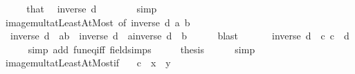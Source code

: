 \begin{isabellebody}
%
\isadelimproof
%
\endisadelimproof
%
\isatagproof
{}\isamarkupfalse%
\ {\isacharminus}{\kern0pt}\isanewline
\ \ \isamarkupfalse%
\ that\ \isamarkupfalse%
\ {\isachardoublequoteopen}inverse\ d\ {\isachargreater}{\kern0pt}\ {}{\isachardoublequoteclose}\isanewline
\ \ \ \ \isamarkupfalse%
\ simp\isanewline
\ \ \isamarkupfalse%
\ image{\isacharunderscore}{\kern0pt}mult{\isacharunderscore}{\kern0pt}atLeastAtMost\ {\isacharbrackleft}{\kern0pt}of\ {\isachardoublequoteopen}inverse\ d{\isachardoublequoteclose}\ a\ b{\isacharbrackright}{\kern0pt}\isanewline
\ \ \isamarkupfalse%
\ {\isachardoublequoteopen}{\isacharparenleft}{\kern0pt}{\isacharasterisk}{\kern0pt}{\isacharparenright}{\kern0pt}\ {\isacharparenleft}{\kern0pt}inverse\ d{\isacharparenright}{\kern0pt}\ {\isacharbackquote}{\kern0pt}\ {\isacharbraceleft}{\kern0pt}a{\isachardot}{\kern0pt}{\isachardot}{\kern0pt}b{\isacharbraceright}{\kern0pt}\ {\isacharequal}{\kern0pt}\ {\isacharbraceleft}{\kern0pt}inverse\ d\ {\isacharasterisk}{\kern0pt}\ a{\isachardot}{\kern0pt}{\isachardot}{\kern0pt}inverse\ d\ {\isacharasterisk}{\kern0pt}\ b{\isacharbraceright}{\kern0pt}{\isachardoublequoteclose}\isanewline
\ \ \ \ \isamarkupfalse%
\ blast\isanewline
\ \ \isamarkupfalse%
\ \isamarkupfalse%
\ {\isachardoublequoteopen}{\isacharparenleft}{\kern0pt}{\isacharasterisk}{\kern0pt}{\isacharparenright}{\kern0pt}\ {\isacharparenleft}{\kern0pt}inverse\ d{\isacharparenright}{\kern0pt}\ {\isacharequal}{\kern0pt}\ {\isacharparenleft}{\kern0pt}{\isasymlambda}c{\isachardot}{\kern0pt}\ c\ {\isacharslash}{\kern0pt}\ d{\isacharparenright}{\kern0pt}{\isachardoublequoteclose}\isanewline
\ \ \ \ \isamarkupfalse%
\ {\isacharparenleft}{\kern0pt}simp\ add{\isacharcolon}{\kern0pt}\ fun{\isacharunderscore}{\kern0pt}eq{\isacharunderscore}{\kern0pt}iff\ field{\isacharunderscore}{\kern0pt}simps{\isacharparenright}{\kern0pt}\isanewline
\ \ \isamarkupfalse%
\ \isamarkupfalse%
\ {\isacharquery}{\kern0pt}thesis\isanewline
\ \ \ \ \isamarkupfalse%
\ simp\isanewline
{}\isamarkupfalse%
%
\endisatagproof
{\isafoldproof}%
%
\isadelimproof
\isanewline
%
\endisadelimproof
\isanewline
{}\isamarkupfalse%
\ image{\isacharunderscore}{\kern0pt}mult{\isacharunderscore}{\kern0pt}atLeastAtMost{\isacharunderscore}{\kern0pt}if{\isacharcolon}{\kern0pt}\isanewline
\ \ {\isachardoublequoteopen}{\isacharparenleft}{\kern0pt}{\isacharasterisk}{\kern0pt}{\isacharparenright}{\kern0pt}\ c\ {\isacharbackquote}{\kern0pt}\ {\isacharbraceleft}{\kern0pt}x\ {\isachardot}{\kern0pt}{\isachardot}{\kern0pt}\ y{\isacharbraceright}{\kern0pt}\ {\isacharequal}{\kern0pt}\isanewline

\end{isabellebody}
